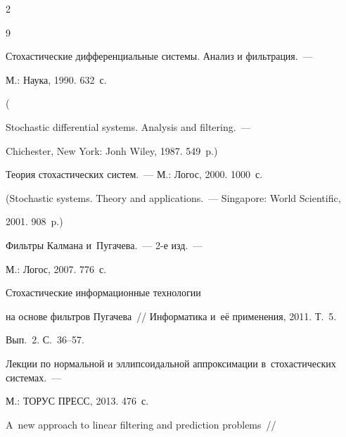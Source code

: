 \begin{multicols}{2}
{\small\frenchspacing

 {%


 \begin{thebibliography}{9}





Стохастические дифференциальные системы. Анализ и фильтрация.~---

М.: Наука,  1990. 632~с.

(

Stochastic differential systems. Analysis and filtering.~---

Chichester, New York: Jonh Wiley, 1987. 549~p.)





Теория стохастических систем.~--- М.: Логос,  2000.  1000~с.

(Stochastic systems. Theory and applications.~--- Singapore: World Scientific,

2001. 908~p.)




 Фильтры Калмана и~Пугачева.~--- 2-е изд.~---

М.: Логос, 2007. 776~с.








 Стохастические информационные технологии

на основе фильтров Пугачева~// Информатика и~её применения, 2011. Т.~5.

Вып.~2. С.~36--57.





Лекции по нормальной и эллипсоидальной аппроксимации в~стохастических системах.~---

М.: ТОРУС ПРЕСС, 2013. 476~с.




 A~new approach to linear filtering and prediction problems~//


\end{thebibliography}}}
\end{multicols}
